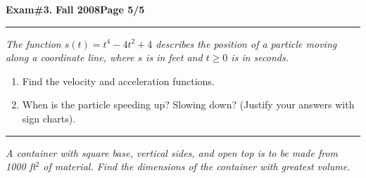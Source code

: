 \documentclass[12pt]{article}
\begin{document}
\hfill{\large\bf Exam\#3.}\hfill{\large\bf
  Fall 2008}\hfill{\large\bf Page 5/5}\hrule

\bigskip
{}
{\problem[20 pts] \em The function $s(t) = t^4 - 4t^2 + 4$ describes the position of a particle moving along a coordinate line, where $s$ is in feet and $t \geq 0$ is in seconds.}
\begin{enumerate}
\item Find the velocity and acceleration functions.
\item When is the particle speeding up? Slowing down? (Justify your answers with sign charts).
\end{enumerate}
\vspace{9cm}
\hrule
{\problem[20 pts] \em A container with square base, vertical sides, and open top is to be made from 1000 ft$^2$ of material.  Find the dimensions of the container with greatest volume.}
\vspace{7cm}
\begin{flushright}
\end{flushright}
\end{document}
